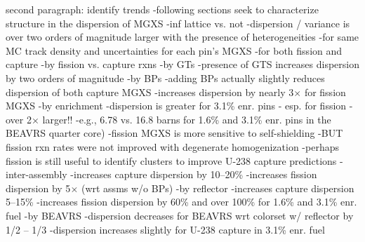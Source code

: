 second paragraph: identify trends
-following sections seek to characterize structure in the dispersion of \ac{MGXS}
-inf lattice vs. not
  -dispersion / variance is over two orders of magnitude larger with the presence of heterogeneities
    -for same \ac{MC} track density and uncertainties for each pin's \ac{MGXS}
    -for both fission and capture 
-by fission vs. capture rxns
-by GTs
  -presence of GTS increases dispersion by two orders of magnitude
-by BPs
  -adding BPs actually slightly reduces dispersion of both capture \ac{MGXS}
  -increases dispersion by nearly 3$\times$ for fission \ac{MGXS}
-by enrichment
  -dispersion is greater for 3.1\% enr. pins - esp. for fission - over 2$\times$ larger!! 
    -e.g., 6.78 vs. 16.8 barns for 1.6\% and 3.1\% enr. pins in the \ac{BEAVRS} quarter core)
    -fission \ac{MGXS} is more sensitive to self-shielding
    -BUT fission rxn rates were not improved with degenerate homogenization
      -perhaps fission is still useful to identify clusters to improve U-238 capture predictions
-inter-assembly
  -increases capture dispersion by 10--20\%
  -increases fission dispersion by 5$\times$ (wrt assms w/o BPs) 
-by reflector
  -increases capture dispersion 5--15\%
  -increases fission dispersion by 60\% and over 100\% for 1.6\% and 3.1\% enr. fuel 
-by BEAVRS
  -dispersion decreases for BEAVRS wrt colorset w/ reflector by 1/2 -- 1/3 
  -dispersion increases slightly for U-238 capture in 3.1\% enr. fuel


